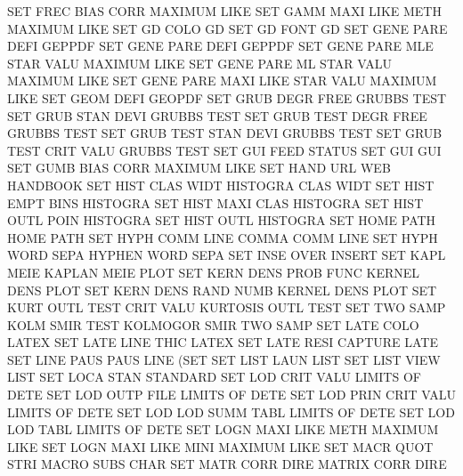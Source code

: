 SET      FREC BIAS CORR                 MAXIMUM  LIKE
SET      GAMM MAXI LIKE METH            MAXIMUM  LIKE
SET      GD   COLO                      GD
SET      GD   FONT                      GD
SET      GENE PARE DEFI                 GEPPDF
SET      GENE PARE DEFI                 GEPPDF
SET      GENE PARE MLE  STAR VALU       MAXIMUM  LIKE
SET      GENE PARE ML   STAR VALU       MAXIMUM  LIKE
SET      GENE PARE MAXI LIKE STAR VALU  MAXIMUM  LIKE
SET      GEOM DEFI                      GEOPDF
SET      GRUB DEGR FREE                 GRUBBS   TEST
SET      GRUB STAN DEVI                 GRUBBS   TEST
SET      GRUB TEST DEGR FREE            GRUBBS   TEST
SET      GRUB TEST STAN DEVI            GRUBBS   TEST
SET      GRUB TEST CRIT VALU            GRUBBS   TEST
SET      GUI  FEED                      STATUS
SET      GUI                            GUI
SET      GUMB BIAS CORR                 MAXIMUM  LIKE
SET      HAND URL                       WEB      HANDBOOK
SET      HIST CLAS WIDT                 HISTOGRA CLAS WIDT
SET      HIST EMPT BINS                 HISTOGRA
SET      HIST MAXI CLAS                 HISTOGRA
SET      HIST OUTL POIN                 HISTOGRA
SET      HIST OUTL                      HISTOGRA
SET      HOME PATH                      HOME     PATH
SET      HYPH COMM LINE                 COMMA    COMM LINE
SET      HYPH WORD SEPA                 HYPHEN   WORD SEPA
SET      INSE OVER                      INSERT
SET      KAPL MEIE                      KAPLAN   MEIE PLOT
SET      KERN DENS PROB FUNC            KERNEL   DENS PLOT
SET      KERN DENS RAND NUMB            KERNEL   DENS PLOT
SET      KURT OUTL TEST CRIT VALU       KURTOSIS OUTL TEST
SET      TWO  SAMP KOLM SMIR TEST       KOLMOGOR SMIR TWO  SAMP
SET      LATE COLO                      LATEX
SET      LATE LINE THIC                 LATEX
SET      LATE RESI                      CAPTURE  LATE
SET      LINE PAUS                      PAUS     LINE (SET
SET      LIST LAUN                      LIST
SET      LIST VIEW                      LIST
SET      LOCA STAN                      STANDARD
SET      LOD      CRIT VALU             LIMITS   OF   DETE
SET      LOD      OUTP FILE             LIMITS   OF   DETE
SET      LOD      PRIN CRIT VALU        LIMITS   OF   DETE
SET      LOD      LOD  SUMM TABL        LIMITS   OF   DETE
SET      LOD      LOD  TABL             LIMITS   OF   DETE
SET      LOGN MAXI LIKE METH            MAXIMUM  LIKE
SET      LOGN MAXI LIKE MINI            MAXIMUM  LIKE
SET      MACR QUOT STRI                 MACRO    SUBS CHAR
SET      MATR CORR DIRE                 MATRIX   CORR DIRE
